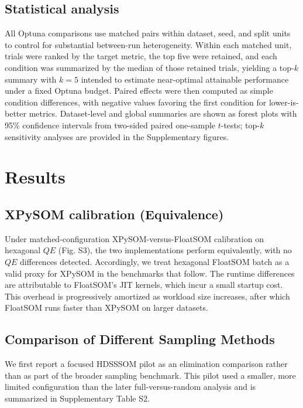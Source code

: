 \documentclass[10pt]{article} %
\begin{document}
\subsection{Statistical analysis}

All Optuna comparisons use matched pairs within dataset, seed, and split units to control for substantial between-run heterogeneity. Within each matched unit, trials were ranked by the target metric, the top five were retained, and each condition was summarized by the median of those retained trials, yielding a top-$k$ summary with $k=5$ intended to estimate near-optimal attainable performance under a fixed Optuna budget. Paired effects were then computed as simple condition differences, with negative values favoring the first condition for lower-is-better metrics. Dataset-level and global summaries are shown as forest plots with 95\% confidence intervals from two-sided paired one-sample $t$-tests; top-$k$ sensitivity analyses are provided in the Supplementary figures.

\section{Results}

\subsection{XPySOM calibration (Equivalence)}

Under matched-configuration XPySOM-versus-FloatSOM calibration on hexagonal $QE$ (Fig. S3), the two implementations perform equivalently, with no $QE$ differences detected. Accordingly, we treat hexagonal FloatSOM batch as a valid proxy for XPySOM in the benchmarks that follow. The runtime differences are attributable to FloatSOM's JIT kernels, which incur a small startup cost. This overhead is progressively amortized as workload size increases, after which FloatSOM runs faster than XPySOM on larger datasets.

\subsection{Comparison of Different Sampling Methods}

We first report a focused HDSSSOM pilot as an elimination comparison rather than as part of the broader sampling benchmark. This pilot used a smaller, more limited configuration than the later full-versus-random analysis and is summarized in Supplementary Table S2.
\end{document}
